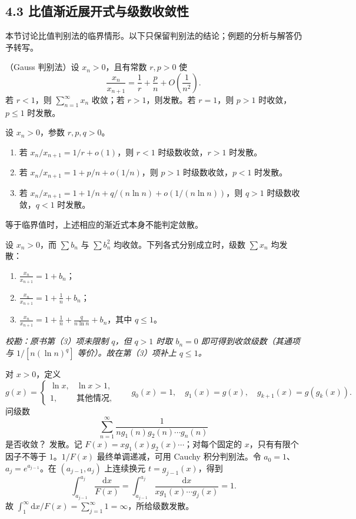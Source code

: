 \subsection*{4.3 比值渐近展开式与级数收敛性}

本节讨论比值判别法的临界情形。以下只保留判别法的结论；例题的分析与解答仍予转写。

（Gauss 判别法）设 $x_n>0$，且有常数 $r,p>0$ 使
\[
\frac{x_n}{x_{n+1}}=\frac1r+\frac pn+O\!\left(\frac1{n^2}\right).
\]
若 $r<1$，则 $\sum_{n=1}^{\infty}x_n$ 收敛；若 $r>1$，则发散。若 $r=1$，则 $p>1$ 时收敛，$p\leq1$ 时发散。

设 $x_n>0$，参数 $r,p,q>0$。
\begin{enumerate}[label=（\arabic*）,leftmargin=3em]
\item 若 $x_n/x_{n+1}=1/r+o(1)$，则 $r<1$ 时级数收敛，$r>1$ 时发散。
\item 若 $x_n/x_{n+1}=1+p/n+o(1/n)$，则 $p>1$ 时级数收敛，$p<1$ 时发散。
\item 若 $x_n/x_{n+1}=1+1/n+q/(n\ln n)+o(1/(n\ln n))$，则 $q>1$ 时级数收敛，$q<1$ 时发散。
\end{enumerate}
等于临界值时，上述相应的渐近式本身不能判定敛散。

设 $x_n>0$，而 $\sum b_n$ 与 $\sum b_n^2$ 均收敛。下列各式分别成立时，级数 $\sum x_n$ 均发散：
\begin{enumerate}[label=（\arabic*）,leftmargin=3em]
\item $\displaystyle \frac{x_n}{x_{n+1}}=1+b_n$；
\item $\displaystyle \frac{x_n}{x_{n+1}}=1+\frac1n+b_n$；
\item $\displaystyle \frac{x_n}{x_{n+1}}=1+\frac1n+\frac{q}{n\ln n}+b_n$，其中 $q\leq1$。
\end{enumerate}
\noindent\textit{校勘：原书第（3）项未限制 $q$，但 $q>1$ 时取 $b_n=0$ 即可得到收敛级数（其通项与 $1/[n(\ln n)^q]$ 等价）。故在第（3）项补上 $q\leq1$。}

对 $x>0$，定义
\[
g(x)=\begin{cases}\ln x,&\ln x>1,\\1,&\text{其他情况},\end{cases}
\qquad g_0(x)=1,\quad g_1(x)=g(x),\quad g_{k+1}(x)=g(g_k(x)).
\]
问级数
\[
\sum_{n=1}^{\infty}\frac{1}{n g_1(n)g_2(n)\cdots g_n(n)}
\]
是否收敛？
\sol 发散。记 $F(x)=xg_1(x)g_2(x)\cdots$；对每个固定的 $x$，只有有限个因子不等于 $1$。$1/F(x)$ 最终单调递减，可用 Cauchy 积分判别法。令 $a_0=1$、$a_j=e^{a_{j-1}}$。在 $(a_{j-1},a_j)$ 上连续换元 $t=g_{j-1}(x)$，得到
\[
\int_{a_{j-1}}^{a_j}\frac{\mathrm dx}{F(x)}
=\int_{a_{j-1}}^{a_j}\frac{\mathrm dx}{xg_1(x)\cdots g_j(x)}=1.
\]
故 $\int_1^{\infty}\!\mathrm dx/F(x)=\sum_{j=1}^{\infty}1=\infty$，所给级数发散。

